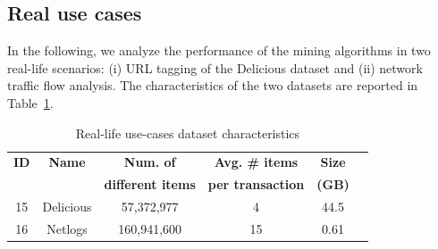 \documentclass[preprint,review,12pt]{elsarticle}
\begin{document}


\subsection{Real use cases}
\label{usecases}

In the following, we analyze the performance of the mining algorithms in two
real-life scenarios:
(i) URL tagging of the Delicious dataset and
(ii) network traffic flow analysis.
The characteristics of the two datasets
are reported in Table~\ref{datasets_real}.

\begin{table}[h!]
\scriptsize
\begin{center}
\caption{Real-life use-cases dataset characteristics}
\label{datasets_real}
\begin{tabular}{|c|c|c|c|c|c|}
\hline
{\bf ID }& {\bf Name} 	&  {\bf Num. of} 	& {\bf  Avg. \# items} 			& {\bf Size} \\
{\bf  }& {\bf  } 		&  {\bf different items} 	& {\bf  per transaction} 	& {\bf (GB) } \\
\hline
\hline
15& Delicious & 57,372,977 & 4 & 44.5 \\ \hline
16 & Netlogs & 160,941,600 & 15 & 0.61  \\ \hline
\end{tabular}
\end{center}
\end{table}
\end{document}
